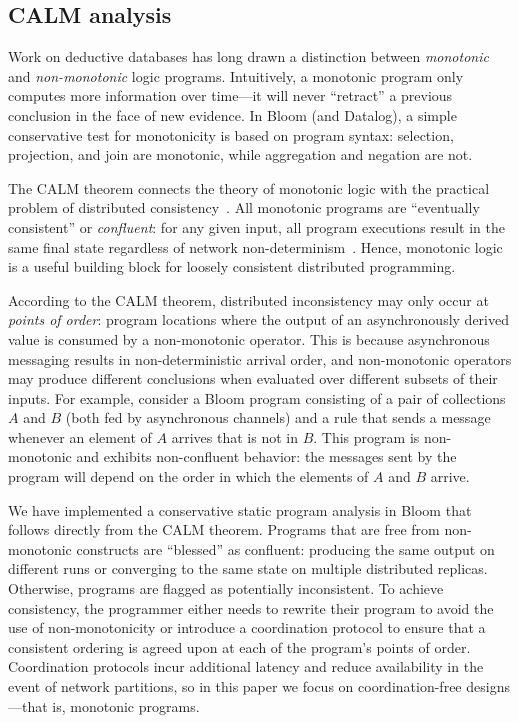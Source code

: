 \subsection{CALM analysis}
\label{sec:bg-calm}

Work on deductive databases has long drawn a distinction between
\emph{monotonic} and \emph{non-monotonic} logic programs. Intuitively, a
monotonic program only computes more information over time---it will never
``retract'' a previous conclusion in the face of new evidence.  In Bloom (and
Datalog), a simple conservative test for monotonicity is based on program
syntax: selection, projection, and join are monotonic, while aggregation and
negation are not.

The CALM theorem connects the theory of monotonic logic with the practical
problem of distributed consistency~\cite{Alvaro2011,Hellerstein2010}.  All
monotonic programs are ``eventually consistent'' or \emph{confluent}: for any
given input, all program executions result in the same final state regardless of
network non-determinism~\cite{Ameloot2011,dedalus-confluence}.  Hence, monotonic
logic is a useful building block for loosely consistent distributed programming.

According to the CALM theorem, distributed inconsistency may only occur at
\emph{points of order}: program locations where the output of an asynchronously
derived value is consumed by a non-monotonic operator.  This is because
asynchronous messaging results in non-deterministic arrival order, and
non-monotonic operators may produce different conclusions when evaluated over
different subsets of their inputs.  For example, consider a Bloom program 
consisting of a pair of collections $A$ and $B$ (both fed by asynchronous
channels) and a rule that sends a message whenever an element of $A$ arrives that is not in $B$.
This
program is non-monotonic and exhibits non-confluent behavior: the messages sent
by the program will depend on the order in which the elements of $A$ and $B$
arrive.

We have implemented a conservative static program analysis in Bloom that follows
directly from the CALM theorem.  Programs that are free from non-monotonic
constructs are ``blessed'' as confluent: producing the same output on different
runs or converging to the same state on multiple distributed replicas.
Otherwise, programs are flagged as potentially inconsistent.  To achieve
consistency, the programmer either needs to rewrite their program to avoid the
use of non-monotonicity or introduce a coordination protocol to ensure that a
consistent ordering is agreed upon at each of the program's points of order. 
Coordination protocols incur additional
latency and reduce availability in the event of network partitions, so in this
paper we focus on coordination-free designs---that is, monotonic programs.

